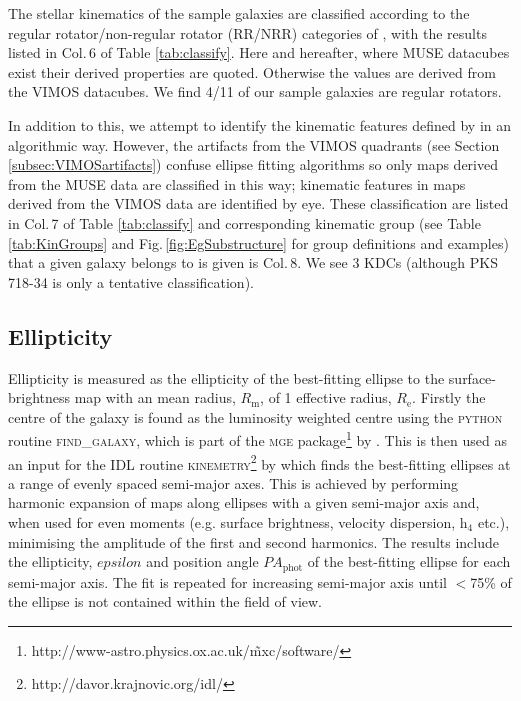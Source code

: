 		The stellar kinematics of the sample galaxies are classified according to the regular rotator/non-regular rotator (RR/NRR) categories of \citet{Krajnovic2011}, with the results listed in Col.\,6 of Table \ref{tab:classify}. Here and hereafter, where MUSE datacubes exist their derived properties are quoted. Otherwise the values are derived from the VIMOS datacubes. We find 4/11 of our sample galaxies are regular rotators.

		In addition to this, we attempt to identify the kinematic features defined by \citet{Krajnovic2011} in an algorithmic way. However, the artifacts from the VIMOS quadrants (see Section \ref{subsec:VIMOSartifacts}) confuse ellipse fitting algorithms so only maps derived from the MUSE data are classified in this way; kinematic features in maps derived from the VIMOS data are identified by eye. These classification are listed in Col.\,7 of Table \ref{tab:classify} and corresponding kinematic group (see Table \ref{tab:KinGroups} and Fig.\,\ref{fig:EgSubstructure} for group definitions and examples) that a given galaxy belongs to is given is Col.\,8. We see 3 KDCs (although PKS 718-34 is only a tentative classification). 


		\subsection{Ellipticity}
			\label{subsec:Ellipticity}
			Ellipticity is measured as the ellipticity of the best-fitting ellipse to the surface-brightness map with an mean radius, $R_\mathrm{m}$, of 1 effective radius, $R_\mathrm{e}$. Firstly the centre of the galaxy is found as the luminosity weighted centre using the \textsc{python} routine \textsc{find\_galaxy}, which is part of the \textsc{mge} package\footnote{http://www-astro.physics.ox.ac.uk/\~mxc/software/} by \citet{Cappellari2002}. This is then used as an input for the \textsc{IDL} routine \textsc{kinemetry}\footnote{http://davor.krajnovic.org/idl/} by \citet{krajnovic2006} which finds the best-fitting ellipses at a range of evenly spaced semi-major axes. This is achieved by performing harmonic expansion of maps along ellipses with a given semi-major axis and, when used for even moments (e.g. surface brightness, velocity dispersion, h$_4$ etc.), minimising the amplitude of the first and second harmonics. The results include the ellipticity, $epsilon$ and position angle $PA_\text{phot}$ of the best-fitting ellipse for each semi-major axis. The fit is repeated for increasing semi-major axis until $<$75\% of the ellipse is not contained within the field of view. 

